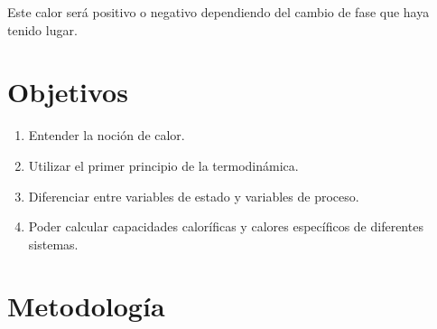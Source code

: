 \documentclass[journal,transmag]{IEEEtran}
\begin{document}
Este calor será positivo o negativo dependiendo del cambio de fase que haya tenido lugar.
\section{Objetivos}

	\begin{enumerate}
		\item Entender la noción de calor.
		\item Utilizar el primer principio de la termodinámica.
		\item Diferenciar entre variables de estado y variables de proceso.
		\item Poder calcular capacidades caloríficas y calores específicos de diferentes sistemas. 
	\end{enumerate}
	

\section{Metodología}
\end{document}
